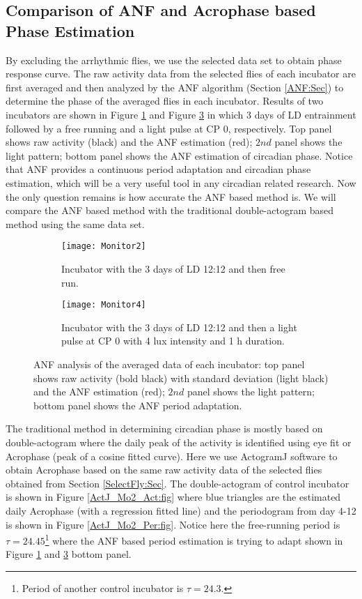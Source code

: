 \documentclass[11pt, onecolumn]{IEEEtran}
\begin{document}
\subsection{Comparison of ANF and Acrophase based Phase Estimation}\label{PRCacto:section}
By excluding the arrhythmic flies, we use the selected data set to obtain phase response curve. The raw activity data from the selected flies of each incubator are first averaged and then analyzed by the ANF algorithm (Section \ref{ANF:Sec}) to determine the phase of the averaged flies in each incubator. Results of two incubators are shown in Figure \ref{Monitor2:fig} and Figure \ref{Monitor4:fig} in which 3 days of LD entrainment followed by a free running and a light pulse at CP 0, respectively. Top panel shows raw activity (black) and the ANF estimation (red); $2{nd}$ panel shows the light pattern; bottom panel shows the ANF estimation of circadian phase. Notice that ANF provides a continuous period adaptation and circadian phase estimation, which will be a very useful tool in any circadian related research. Now the only question remains is how accurate the ANF based method is. We will compare the ANF based method with the traditional double-actogram based method using the same data set.

\begin{figure}
        \centering
        \begin{subfigure}[t]{0.45\textwidth}
                \texttt{[image: Monitor2]}
                \caption{Incubator with the 3 days of LD 12:12 and then free run. \label{Monitor2:fig}}
        \end{subfigure}
        \qquad
        \begin{subfigure}[t]{0.45\textwidth}
                \texttt{[image: Monitor4]}
                \caption{Incubator with the 3 days of LD 12:12 and then a light pulse at CP 0 with 4 lux intensity and 1 h duration.\label{Monitor4:fig}}
        \end{subfigure}
        \caption{ANF analysis of the averaged data of each incubator: top panel shows raw activity (bold black) with standard deviation (light black) and the ANF estimation (red); $2{nd}$ panel shows the light pattern; bottom panel shows the ANF period adaptation.}
\end{figure}


The traditional method in determining circadian phase is mostly based on double-actogram where the daily peak of the activity is identified using eye fit or Acrophase (peak of a cosine fitted curve). Here we use ActogramJ software \cite{ActoJ} to obtain Acrophase based on the same raw activity data of the selected flies obtained from Section \ref{SelectFly:Sec}. The double-actogram of control incubator is shown in Figure \ref{ActJ_Mo2_Act:fig} where blue triangles are the estimated daily Acrophase (with a regression fitted line) and the periodogram from day 4-12 is shown in Figure \ref{ActJ_Mo2_Per:fig}. Notice here the free-running period is $\tau = 24.45$\footnote{Period of another control incubator is $\tau = 24.3$.} where the ANF based period estimation is trying to adapt shown in Figure \ref{Monitor2:fig} and \ref{Monitor4:fig} bottom panel.
\end{document}
